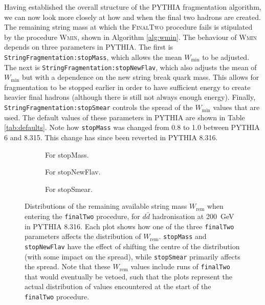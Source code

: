 \documentclass[12pt,a4paper]{report}
\begin{document}
Having established the overall structure of the PYTHIA fragmentation algorithm, we can now look more closely at how and when the final two hadrons are created. The remaining string mass at which the \textsc{FinalTwo} procedure fails is stipulated by the procedure \textsc{Wmin}, shown in Algorithm \ref{alg:wmin}. The behaviour of \textsc{Wmin} depends on three parameters in PYTHIA. The first is \texttt{StringFragmentation:stopMass}, which allows the mean $W_\text{min}$ to be adjusted. The next is \texttt{StringFragmentation:stopNewFlav}, which also adjusts the mean of $W_\text{min}$ but with a dependence on the new string break quark mass. This allows for fragmentation to be stopped earlier in order to have sufficient energy to create heavier final hadrons (although there is still not always enough energy). Finally, \texttt{StringFragmentation:stopSmear} controls the spread of the $W_\text{min}$ values that are used. The default values of these parameters in PYTHIA are shown in Table \ref{tab:defaults}. Note how \texttt{stopMass} was changed from 0.8 to 1.0 between PYTHIA 6 and 8.315. This change has since been reverted in PYTHIA 8.316.

\begin{figure}
  \centering
  \begin{subfigure}{0.32\linewidth}
    \centering
    
    \caption{For stopMass.}
    \label{fig:wrem-stopmass}
  \end{subfigure}
  \hfill
  \begin{subfigure}{0.32\linewidth}
    \centering
    
    \caption{For stopNewFlav.}
    \label{fig:wrem-stopnewflav}
  \end{subfigure}
  \hfill
  \begin{subfigure}{0.32\linewidth}
    \centering
    
    \caption{For stopSmear.}
    \label{fig:wrem-stopsmear}
  \end{subfigure}
  \caption{Distributions of the remaining available string mass $W_\text{rem}$ when entering the \texttt{finalTwo} procedure, for $d\bar{d}$ hadronisation at \qty{200}{\giga\electronvolt} in PYTHIA 8.316. Each plot shows how one of the three \texttt{finalTwo} parameters affects the distribution of $W_\text{rem}$. \texttt{stopMass} and \texttt{stopNewFlav} have the effect of shifting the centre of the distribution (with some impact on the spread), while \texttt{stopSmear} primarily affects the spread. Note that these $W_\text{rem}$ values include runs of \texttt{finalTwo} that would eventually be vetoed, such that the plots represent the actual distribution of values encountered at the start of the \texttt{finalTwo} procedure.}
\end{figure}
\end{document}
